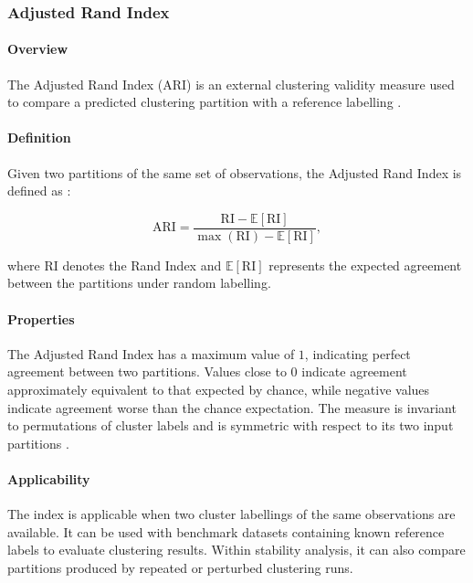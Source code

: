 \subsubsection{Adjusted Rand Index}
\label{sec:measure:adjusted_rand}

\paragraph{Overview}
\label{sec:measure:adjusted_rand:overview}

The Adjusted Rand Index (ARI) is an external clustering validity measure used to compare a predicted clustering partition with a reference labelling \cite{ref_35}.

\paragraph{Definition}
\label{sec:measure:adjusted_rand:definition}

Given two partitions of the same set of observations, the Adjusted Rand Index is defined as \cite{ref_35}:

\[
\mathrm{ARI}
=
\frac{
\mathrm{RI} - \mathbb{E}[\mathrm{RI}]
}{
\max(\mathrm{RI}) - \mathbb{E}[\mathrm{RI}]
},
\]

where \(\mathrm{RI}\) denotes the Rand Index and
\(\mathbb{E}[\mathrm{RI}]\) represents the expected agreement between the
partitions under random labelling.

\paragraph{Properties}
\label{sec:measure:adjusted_rand:properties}

The Adjusted Rand Index has a maximum value of \(1\), indicating perfect agreement between two partitions. Values close to \(0\) indicate agreement approximately equivalent to that expected by chance, while negative values indicate agreement worse than the chance expectation. The measure is invariant to permutations of cluster labels and is symmetric with respect to its two input partitions \cite{ref_35}.

\paragraph{Applicability}
\label{sec:measure:adjusted_rand:applicability}

The index is applicable when two cluster labellings of the same observations are available. It can be used with benchmark datasets containing known reference labels to evaluate clustering results. Within stability analysis, it can also compare partitions produced by repeated or perturbed clustering runs.

